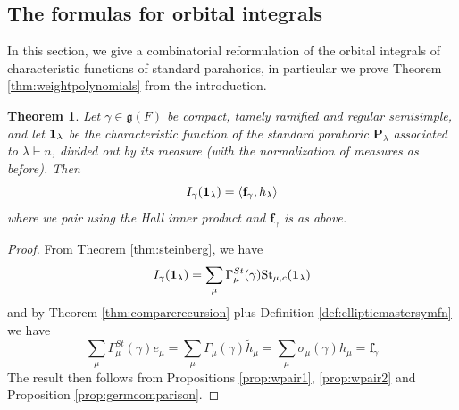 \documentclass{amsart}
\numberwithin{equation}{section}
\newtheorem{theorem}[lemma]{Theorem}%
\theoremstyle{definition}
\newtheorem{remark}[lemma]{Remark}%
\newtheorem{definition}[lemma]{Definition}%
\def\16{{\bf 16}}
\def\1{{\bf 1}}
\def\tilde{\widetilde}
\renewcommand{\th}{\tilde{h}}
\newcommand{\fgamma}{\mathbf{f}_{\gamma}}
\newcommand{\fm}{\mathfrak{m}}
\newcommand{\fg}{\mathfrak{g}}
\newcommand{\bP}{\mathbf{P}}
\newcommand{\St}{\mathrm{St}}
\begin{document}
\subsection{The formulas for orbital integrals}
In this section, we give a combinatorial reformulation of the orbital integrals of characteristic functions of standard parahorics, in particular we prove Theorem \ref{thm:weightpolynomials} from the introduction.

\begin{theorem}
\label{thm:orbintformula}
Let $\gamma\in \fg(F)$ be compact, tamely ramified and regular semisimple, and let $\1_\lambda$ be the characteristic function of the standard parahoric $\bP_\lambda$ associated to $\lambda\vdash n$, divided out by its measure (with the normalization of measures as before). Then
$$I_\gamma(\1_\lambda)=\langle \fgamma,h_\lambda\rangle$$ where we pair using the Hall inner product and $\fgamma$ is as above.
\end{theorem}
\begin{proof}
From Theorem \ref{thm:steinberg}, 
we have $$I_\gamma(\1_\lambda)=\sum_\mu \Gamma^{St}_\mu(\gamma) \St_{\mu,c}(\1_\lambda)$$ and by Theorem \ref{thm:comparerecursion} plus Definition \ref{def:ellipticmastersymfn} we have 
$$\sum_\mu \Gamma^{St}_\mu(\gamma) e_\mu=\sum_\mu \Gamma_\mu(\gamma) \th_\mu=\sum_{\mu} \sigma_\mu(\gamma)h_\mu=\fgamma$$
The result then follows from Propositions \ref{prop:wpair1}, \ref{prop:wpair2} and Proposition \ref{prop:germcomparison}.
\end{proof}
\end{document}
